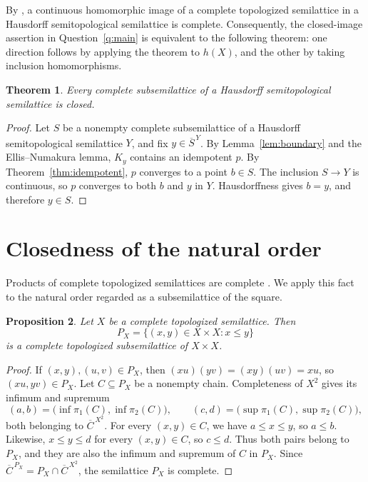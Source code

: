 \documentclass[11pt,a4paper]{article}
\newtheorem{theorem}{Theorem}[section]
\newtheorem{proposition}[theorem]{Proposition}
\theoremstyle{definition}
\theoremstyle{remark}
\numberwithin{equation}{section}
\newcommand{\cl}[1]{\overline{#1}}
\begin{document}
By \cite[Lemma~5.3]{BB}, a continuous homomorphic image of a complete
topologized semilattice in a Hausdorff semitopological semilattice is
complete. Consequently, the closed-image assertion in
Question~\ref{q:main} is equivalent to the following theorem: one
direction follows by applying the theorem to \(h(X)\), and the other
by taking inclusion homomorphisms.

\begin{theorem}\label{thm:closed-subsemilattice}
Every complete subsemilattice of a Hausdorff semitopological semilattice
is closed.
\end{theorem}

\begin{proof}
Let \(S\) be a nonempty complete subsemilattice of a Hausdorff
semitopological semilattice \(Y\), and fix \(y\in\cl S^{\,Y}\).
By Lemma~\ref{lem:boundary} and the Ellis--Numakura lemma, \(K_y\)
contains an idempotent \(p\). By Theorem~\ref{thm:idempotent}, \(p\)
converges to a point \(b\in S\). The inclusion \(S\to Y\) is
continuous, so \(p\) converges to both \(b\) and \(y\) in \(Y\).
Hausdorffness gives \(b=y\), and therefore \(y\in S\).
\end{proof}

\section{Closedness of the natural order}\label{sec:natural-order}
Products of complete topologized semilattices are complete
\cite[Proposition~5.2]{BB}. We apply this fact to the natural order
regarded as a subsemilattice of the square.

\begin{proposition}\label{prop:complete-order-graph}
Let \(X\) be a complete topologized semilattice. Then
\[
P_X=\{(x,y)\in X\times X:x\le y\}
\]
is a complete topologized subsemilattice of \(X\times X\).
\end{proposition}

\begin{proof}
If \((x,y),(u,v)\in P_X\), then
\((xu)(yv)=(xy)(uv)=xu\), so \((xu,yv)\in P_X\).
Let \(C\subseteq P_X\) be a nonempty chain. Completeness of \(X^2\)
gives its infimum and supremum
\[
(a,b)=\bigl(\inf\pi_1(C),\inf\pi_2(C)\bigr),\qquad
(c,d)=\bigl(\sup\pi_1(C),\sup\pi_2(C)\bigr),
\]
both belonging to \(\cl C^{\,X^2}\).
For every \((x,y)\in C\), we have \(a\le x\le y\), so
\(a\le b\). Likewise, \(x\le y\le d\) for every \((x,y)\in C\),
so \(c\le d\). Thus both pairs belong to \(P_X\), and they are
also the infimum and supremum of \(C\) in \(P_X\). Since
\(\cl C^{\,P_X}=P_X\cap\cl C^{\,X^2}\), the semilattice \(P_X\)
is complete.
\end{proof}
\end{document}
